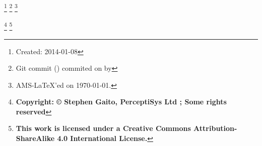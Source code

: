 \author{Stephen Gaito}
\address{PerceptiSys Ltd, 21 Gregory Ave, Coventry, CV3 6DJ, United Kingdom}%
%


\thanks{Created: 2014-01-08}
\thanks{Git commit \gitReferences{} (\gitAbbrevHash{}) commited on \gitAuthorDate{} by \gitAuthorName{}}
\thanks{AMS-\LaTeX{}'ed on \today{}.}

\thanks{\textbf{Copyright: \copyright{} Stephen Gaito, PerceptiSys Ltd \the\year{}; Some rights reserved}}
\thanks{\textbf{This work is licensed under a Creative Commons Attribution-ShareAlike 4.0 International License.}}
